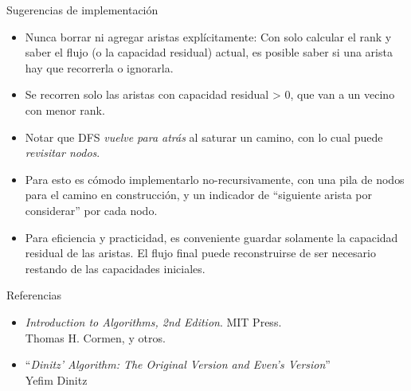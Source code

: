 \documentclass{beamer}
\begin{document}
\begin{frame}{Sugerencias de implementación}
    \begin{itemize}
        \item Nunca borrar ni agregar aristas explícitamente: Con solo calcular el rank y saber el flujo (o la capacidad residual) actual, es posible saber si una arista hay que recorrerla o ignorarla.
        \item Se recorren solo las aristas con capacidad residual > 0, que van a un vecino con menor rank.
        \item Notar que DFS \textit{vuelve para atrás} al saturar un camino, con lo cual puede \textit{revisitar nodos}.
        \item Para esto es cómodo implementarlo no-recursivamente, con una pila de nodos para el camino en construcción,
                y un indicador de ``siguiente arista por considerar'' por cada nodo.
        \item Para eficiencia y practicidad, es conveniente guardar solamente la capacidad residual de las aristas.
               El flujo final puede reconstruirse de ser necesario restando de las capacidades iniciales.
    \end{itemize}
\end{frame}

\begin{frame}{Referencias}
    \begin{itemize}
        \item \textit{Introduction to Algorithms, 2nd Edition}. MIT Press. \\ Thomas H. Cormen, y otros.
        \item ``\textit{Dinitz' Algorithm: The Original Version and Even's Version}'' \\ Yefim Dinitz
    \end{itemize}
\end{frame}
\end{document}

